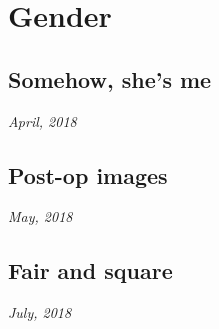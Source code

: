 \chapter{Gender}

\newpage

\section*{Somehow, she's me}

\hfill\textit{April, 2018}


\newpage


\section*{Post-op images}

\hfill\textit{May, 2018}


\newpage


\section*{Fair and square}

\hfill\textit{July, 2018}


